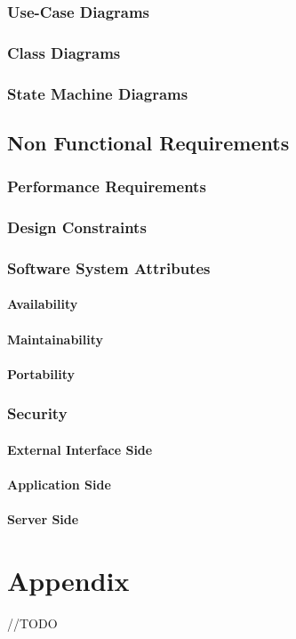 \documentclass{report}
\begin{document}
		\subsection{Use-Case Diagrams}

		\subsection{Class Diagrams}

		\subsection{State Machine Diagrams}

	\section{Non Functional Requirements}

		\subsection{Performance Requirements}

		\subsection{Design Constraints}

		\subsection{Software System Attributes}

			\subsubsection{Availability}

			\subsubsection{Maintainability}

			\subsubsection{Portability}

		\subsection{Security}

			\subsubsection{External Interface Side}

			\subsubsection{Application Side}

			\subsubsection{Server Side}


\chapter{Appendix}
//TODO
\end{document}
